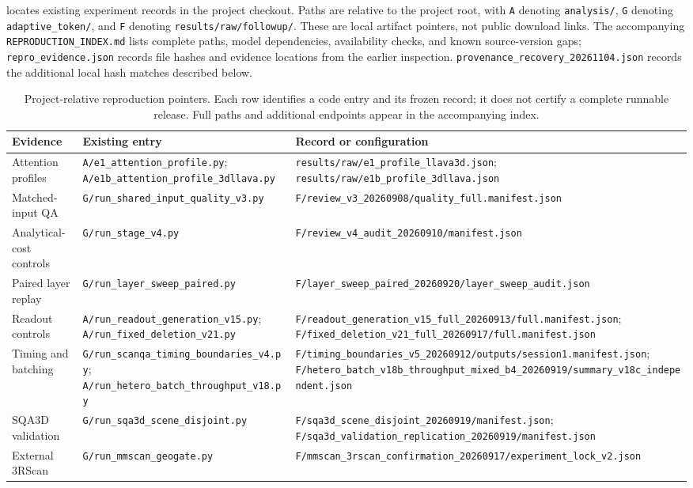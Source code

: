  locates existing experiment records in the project checkout. Paths are relative to the project root, with \texttt{A} denoting \texttt{analysis/}, \texttt{G} denoting \texttt{adaptive\_token/}, and \texttt{F} denoting \texttt{results/raw/followup/}. These are local artifact pointers, not public download links. The accompanying \nolinkurl{REPRODUCTION_INDEX.md} lists complete paths, model dependencies, availability checks, and known source-version gaps; \nolinkurl{repro_evidence.json} records file hashes and evidence locations from the earlier inspection. \nolinkurl{provenance_recovery_20261104.json} records the additional local hash matches described below.

\begin{table}[t]
\centering
\caption{Project-relative reproduction pointers. Each row identifies a code entry and its frozen record; it does not certify a complete runnable release. Full paths and additional endpoints appear in the accompanying index.}
\label{tab:supp_repro_entries}
\begin{tabular}{@{}>{\raggedright\arraybackslash}p{}>{\raggedright\arraybackslash}p{}>{\raggedright\arraybackslash}p{}@{}}
\toprule
Evidence & Existing entry & Record or configuration \\
\midrule
Attention profiles & \nolinkurl{A/e1_attention_profile.py};
\nolinkurl{A/e1b_attention_profile_3dllava.py} &
\nolinkurl{results/raw/e1_profile_llava3d.json};
\nolinkurl{results/raw/e1b_profile_3dllava.json} \\
Matched-input QA & \nolinkurl{G/run_shared_input_quality_v3.py} &
\nolinkurl{F/review_v3_20260908/quality_full.manifest.json} \\
Analytical-cost controls & \nolinkurl{G/run_stage_v4.py} &
\nolinkurl{F/review_v4_audit_20260910/manifest.json} \\
Paired layer replay & \nolinkurl{G/run_layer_sweep_paired.py} &
\nolinkurl{F/layer_sweep_paired_20260920/layer_sweep_audit.json} \\
Readout controls & \nolinkurl{A/run_readout_generation_v15.py};
\nolinkurl{A/run_fixed_deletion_v21.py} &
\nolinkurl{F/readout_generation_v15_full_20260913/full.manifest.json};
\nolinkurl{F/fixed_deletion_v21_full_20260917/full.manifest.json} \\
Timing and batching & \nolinkurl{G/run_scanqa_timing_boundaries_v4.py};
\nolinkurl{A/run_hetero_batch_throughput_v18.py} &
\nolinkurl{F/timing_boundaries_v5_20260912/outputs/session1.manifest.json};
\nolinkurl{F/hetero_batch_v18b_throughput_mixed_b4_20260919/summary_v18c_independent.json} \\
SQA3D validation & \nolinkurl{G/run_sqa3d_scene_disjoint.py} &
\nolinkurl{F/sqa3d_scene_disjoint_20260919/manifest.json};
\nolinkurl{F/sqa3d_validation_replication_20260919/manifest.json} \\
External 3RScan & \nolinkurl{G/run_mmscan_geogate.py} &
\nolinkurl{F/mmscan_3rscan_confirmation_20260917/experiment_lock_v2.json} \\
\bottomrule
\end{tabular}
\end{table}

